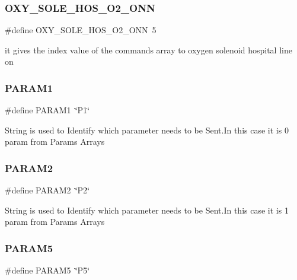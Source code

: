 \subsubsection{\texorpdfstring{O\+X\+Y\+\_\+\+S\+O\+L\+E\+\_\+\+H\+O\+S\+\_\+\+O2\+\_\+\+O\+NN}{OXY\_SOLE\_HOS\_O2\_ONN}}
{\footnotesize\ttfamily \#define O\+X\+Y\+\_\+\+S\+O\+L\+E\+\_\+\+H\+O\+S\+\_\+\+O2\+\_\+\+O\+NN~5}

it gives the index value of the commands array to oxygen solenoid hospital line on \mbox{\label{group___state_control_module_ga7592aa1eaa790ae27e542130b3864191}} 
\subsubsection{\texorpdfstring{P\+A\+R\+A\+M1}{PARAM1}}
{\footnotesize\ttfamily \#define P\+A\+R\+A\+M1~\char`\"{}P1\char`\"{}}

String is used to Identify which parameter needs to be Sent.\+In this case it is 0 param from Params Arrays \mbox{\label{group___state_control_module_gabdd1bc0c9e1b837bbf643458c90e44c4}} 
\subsubsection{\texorpdfstring{P\+A\+R\+A\+M2}{PARAM2}}
{\footnotesize\ttfamily \#define P\+A\+R\+A\+M2~\char`\"{}P2\char`\"{}}

String is used to Identify which parameter needs to be Sent.\+In this case it is 1 param from Params Arrays \mbox{\label{group___state_control_module_ga5febf7030347536205e990838c8731cf}} 
\subsubsection{\texorpdfstring{P\+A\+R\+A\+M5}{PARAM5}}
{\footnotesize\ttfamily \#define P\+A\+R\+A\+M5~\char`\"{}P5\char`\"{}}

